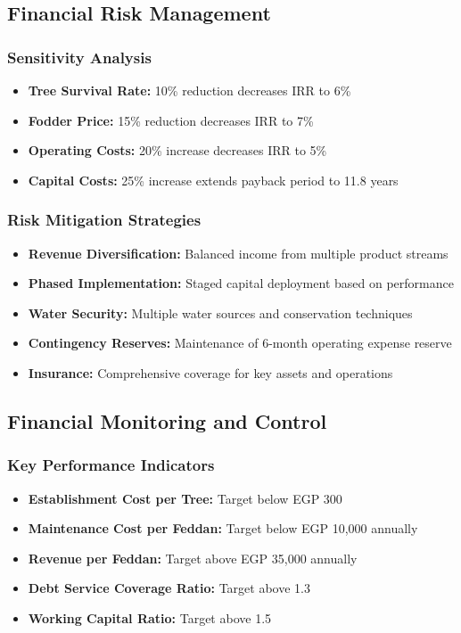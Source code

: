 \subsection{Financial Risk Management}

\subsubsection{Sensitivity Analysis}
\begin{itemize}
    \item \textbf{Tree Survival Rate:} 10\% reduction decreases IRR to 6\%
    \item \textbf{Fodder Price:} 15\% reduction decreases IRR to 7\%
    \item \textbf{Operating Costs:} 20\% increase decreases IRR to 5\%
    \item \textbf{Capital Costs:} 25\% increase extends payback period to 11.8 years
\end{itemize}

\subsubsection{Risk Mitigation Strategies}
\begin{itemize}
    \item \textbf{Revenue Diversification:} Balanced income from multiple product streams
    \item \textbf{Phased Implementation:} Staged capital deployment based on performance
    \item \textbf{Water Security:} Multiple water sources and conservation techniques
    \item \textbf{Contingency Reserves:} Maintenance of 6-month operating expense reserve
    \item \textbf{Insurance:} Comprehensive coverage for key assets and operations
\end{itemize}

\subsection{Financial Monitoring and Control}

\subsubsection{Key Performance Indicators}
\begin{itemize}
    \item \textbf{Establishment Cost per Tree:} Target below EGP 300
    \item \textbf{Maintenance Cost per Feddan:} Target below EGP 10,000 annually
    \item \textbf{Revenue per Feddan:} Target above EGP 35,000 annually
    \item \textbf{Debt Service Coverage Ratio:} Target above 1.3
    \item \textbf{Working Capital Ratio:} Target above 1.5
\end{itemize}

